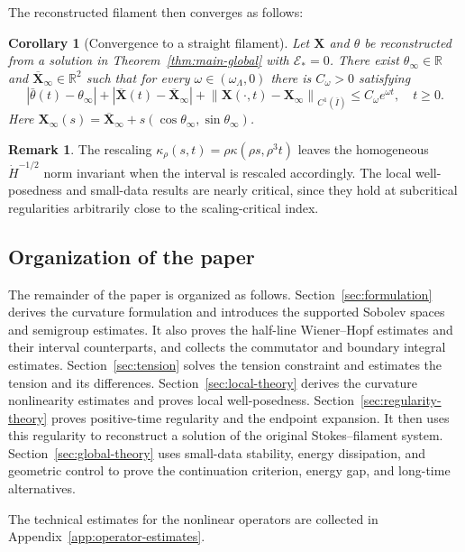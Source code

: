 \documentclass[11pt,reqno]{amsart}
\theoremstyle{plain}
\newtheorem{corollary}[theorem]{Corollary}
\theoremstyle{definition}
\newtheorem{remark}[theorem]{Remark}
\numberwithin{equation}{section}
\newcommand{\mc}[1]{\mathcal{#1}}
\newcommand{\bm}[1]{\boldsymbol{#1}}
\newcommand{\norm}[1]{\left\lVert #1 \right\rVert}
\newcommand{\R}{\mathbb{R}}
\begin{document}
The reconstructed filament then converges as follows:
\begin{corollary}[Convergence to a straight filament]
\label{cor:main-straightening}
Let $\bm X$ and $\theta$ be reconstructed from a solution in
Theorem~\ref{thm:main-global} with $\mc E_*=0$.
There exist $\theta_\infty\in\R$ and
$\overline{\bm X}_\infty\in\R^2$ such that for every
$\omega\in(\omega_\Lambda,0)$ there is $C_\omega>0$ satisfying
\begin{equation*}
    |\bar\theta(t)-\theta_\infty|
    +|\overline{\bm X}(t)-\overline{\bm X}_\infty|
    +\norm{\bm X(\cdot,t)-\bm X_\infty}_{C^1(\overline I)}
    \le C_\omega e^{\omega t},\quad t\ge0.
\end{equation*}
Here $\bm X_\infty(s)=\overline{\bm X}_\infty
+s(\cos\theta_\infty,\sin\theta_\infty)$.
\end{corollary}

\begin{remark}
The rescaling $\kappa_\rho(s,t)=\rho\kappa(\rho s,\rho^3t)$ leaves the homogeneous $\dot H^{-1/2}$ norm invariant when the interval is rescaled accordingly. The local well-posedness and small-data results are nearly critical, since they hold at subcritical regularities arbitrarily close to the scaling-critical index.
\end{remark}

\subsection{Organization of the paper}
The remainder of the paper is organized as follows.
Section~\ref{sec:formulation} derives the curvature formulation and introduces
the supported Sobolev spaces and semigroup estimates. It also proves the
half-line Wiener--Hopf estimates and their interval counterparts, and
collects the commutator and boundary integral estimates.
Section~\ref{sec:tension} solves the tension constraint and estimates the
tension and its differences. Section~\ref{sec:local-theory} derives the
curvature nonlinearity estimates and proves local well-posedness.
Section~\ref{sec:regularity-theory} proves positive-time regularity and the
endpoint expansion. It then uses this regularity to reconstruct a solution of
the original Stokes--filament system. Section~\ref{sec:global-theory} uses
small-data stability, energy dissipation, and geometric control to prove the
continuation criterion, energy gap, and long-time alternatives.

The technical estimates for the nonlinear operators are collected in
Appendix~\ref{app:operator-estimates}.
\end{document}
